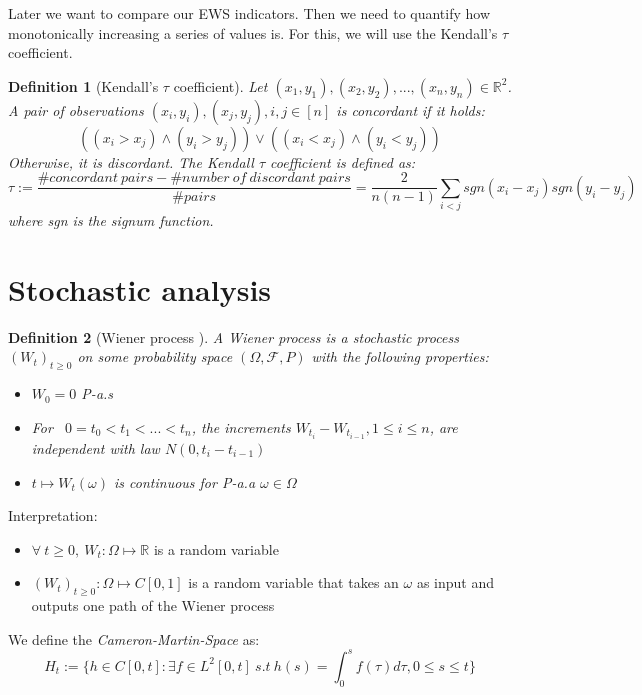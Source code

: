 \documentclass[%
thesis=student,%
coverpage=false,%
titlepage=false,%
headmarks=true, %
english,%
font=libertine, %
math=newpxtx, %
BCOR=5mm,%
coverBCOR=11mm%
]{tumbook}
\newtheorem{definition}{Definition}[section]
\begin{document}
Later we want to compare our EWS indicators. Then we need to quantify how monotonically increasing a series of values is. For this, we will use the Kendall's $\tau$ coefficient. 

\begin{definition}[Kendall's $\tau$ coefficient]
\label{def:Kendall tau}
Let $(x_{1},y_{1}),(x_{2},y_{2}),...,(x_{n},y_{n})\in \mathbb{R}^{2}$. A pair of observations $(x_{i},y_{i}),(x_{j},y_{j}), i,j \in [n]$ is concordant if it holds:
\[
((x_{i} > x_{j}) \wedge (y_{i} > y_{j})) \vee
((x_{i} < x_{j}) \wedge (y_{i} < y_{j}))
\]
Otherwise, it is discordant. The Kendall $\tau$ coefficient is defined as:
\[
\tau := \frac{\#concordant\ pairs - \#number\ of\ discordant\ pairs}{\#pairs} = \frac{2}{n(n-1)}\sum_{i<j}sgn(x_{i}-x_{j})sgn(y_{i}-y_{j})
\]
where sgn is the signum function.    
\end{definition}


\section{Stochastic analysis}
\label{stochastic analysis}

\begin{definition}[Wiener process \cite{gantert:2024}]
A Wiener process is a stochastic process $(W_{t})_{t\geq 0}$ on some probability space $(\Omega,\mathcal{F},P)$ with the following properties: 
\begin{itemize}
    \item $W_{0} = 0$ P-a.s
    \item For \ $0 = t_{0} < t_{1} < ... < t_{n}$, the increments $W_{t_{i}} - W_{t_{i-1}}, 1 \leq i \leq n$, are independent with law $N(0,t_{i}-t_{i-1})$
    \item $t \mapsto W_{t}(\omega)$ is continuous for P-a.a $\omega \in \Omega$
\end{itemize}
\end{definition}

Interpretation: 

\begin{itemize}
    \item $\forall \ t \geq 0, \ W_{t}: \Omega \mapsto \mathbb{R}$ is a random variable 
    \item $(W_{t})_{t \geq 0} : \Omega \mapsto C[0,1]$ is a random variable that takes an $\omega$ as input and outputs one path of the Wiener process
\end{itemize}

We define the \textit{Cameron-Martin-Space} as:
\[
H_{t} := \{ h \in C[0,t]: \exists f \in L^{2}[0,t] \ s.t \  h(s) = \int_{0}^{s} f(\tau) d\tau, 0 \leq s \leq t \}
\]
\end{document}
